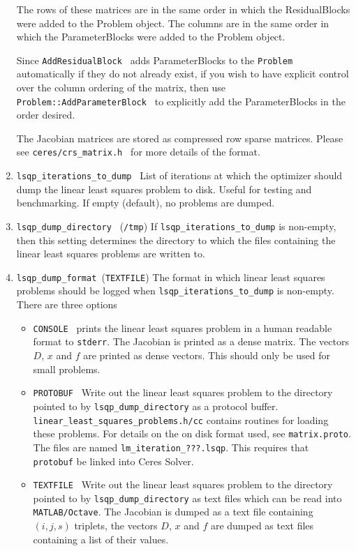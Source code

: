 \begin{enumerate}
The rows of these matrices are in the same order in which the
ResidualBlocks were added to the Problem object. The columns are in
the same order in which the ParameterBlocks were added to the Problem
object.

Since \texttt{AddResidualBlock } adds ParameterBlocks to the
\texttt{Problem } automatically if they do not already exist, if you
wish to have explicit control over the column ordering of the matrix,
then use \texttt{Problem::AddParameterBlock } to explicitly add the
ParameterBlocks in the order desired.

The Jacobian matrices are stored as compressed row sparse
matrices. Please see \texttt{ceres/crs\_matrix.h } for more details of
the format.

\item{\texttt{lsqp\_iterations\_to\_dump }} List of iterations at
  which the optimizer should dump the linear least squares problem to
  disk. Useful for testing and benchmarking. If empty (default), no
  problems are dumped.

\item{\texttt{lsqp\_dump\_directory }} (\texttt{/tmp})
 If \texttt{lsqp\_iterations\_to\_dump} is non-empty, then this
 setting determines the directory to which the files containing the
 linear least squares problems are written to.


\item{\texttt{lsqp\_dump\_format }}(\texttt{TEXTFILE}) The format in
  which linear least squares problems should be logged
when \texttt{lsqp\_iterations\_to\_dump} is non-empty.  There are three options
\begin{itemize}
\item{\texttt{CONSOLE }} prints the linear least squares problem in a human readable format
  to \texttt{stderr}. The Jacobian is printed as a dense matrix. The vectors
   $D$, $x$ and $f$ are printed as dense vectors. This should only be used
   for small problems.
\item{\texttt{PROTOBUF }}
   Write out the linear least squares problem to the directory
   pointed to by \texttt{lsqp\_dump\_directory} as a protocol
   buffer. \texttt{linear\_least\_squares\_problems.h/cc} contains routines for
   loading these problems. For details on the on disk format used,
   see \texttt{matrix.proto}. The files are named
   \texttt{lm\_iteration\_???.lsqp}. This requires that
   \texttt{protobuf} be linked into Ceres Solver.
\item{\texttt{TEXTFILE }}
   Write out the linear least squares problem to the directory
   pointed to by \texttt{lsqp\_dump\_directory} as text files
   which can be read into \texttt{MATLAB/Octave}. The Jacobian is dumped as a
   text file containing $(i,j,s)$ triplets, the vectors $D$, $x$ and $f$ are
   dumped as text files containing a list of their values.


\end{itemize}
\end{enumerate}
